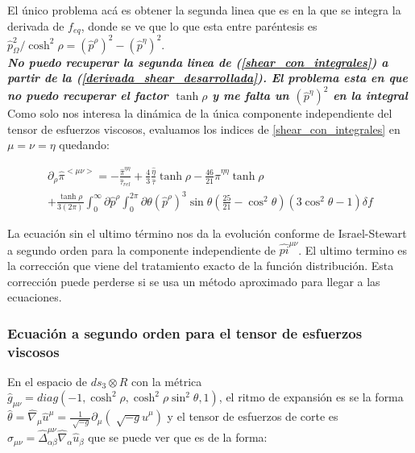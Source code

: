 \documentclass[11pt,a4paper]{article}
\begin{document}
El único problema acá es obtener la segunda linea  que es en la que se integra la derivada de $f_{eq}$, donde se ve que lo que esta entre paréntesis es $\hat{p}_{\Omega}^2/\cosh^2\rho=(\hat{p}^{\rho})^2-(\hat{p}^{\eta})^2$.\\

{\Large{\textbf{\textit{ No puedo recuperar la segunda linea de (\ref{shear_con_integrales}) a partir de la (\ref{derivada_shear_desarrollada}). El problema esta en que no puedo recuperar el factor $\tanh\rho$ y me falta un $(\hat{p}^{\eta})^2$ en la integral}}}}\\

Como solo nos interesa la dinámica de la única componente independiente del tensor de esfuerzos viscosos, evaluamos los indices de \ref{shear_con_integrales} en $\mu=\nu=\eta$ quedando:

\begin{eqnarray}
\partial_{\rho}\hat{\pi}^{<{\mu}{\nu}>}=
-\frac{\hat{\pi}^{{\eta}{\eta}}}{\hat{\tau}_{rel}}
+\frac{4}{3}\frac{\hat{\eta}}{\hat{\tau}}\tanh\rho
-\frac{46}{21}\hat{\pi}^{\eta\eta}\tanh\rho\nonumber\\
+\frac{\tanh\rho}{3(2\pi)}\int_{0}^{\infty}\partial\hat{p}^{\rho}\int_{0}^{2\pi}\partial\theta(\hat{p}^{\rho})^3\sin\theta(\frac{25}{21}-\cos^2\theta)(3\cos^2\theta-1)\delta{f}
\label{shear_exacta}
\end{eqnarray}

La ecuación sin el ultimo término nos da la evolución conforme de Israel-Stewart a segundo orden para la componente independiente de $\hat{pi}^{{\mu}{\nu}}$. El ultimo termino es la corrección que viene del tratamiento exacto de la función distribución. Esta corrección puede perderse si se usa un método aproximado para llegar a las ecuaciones.



\subsubsection{Ecuación a segundo orden para el tensor de esfuerzos viscosos}


En el espacio de $ds_{3}{\otimes}R$ con la métrica $\hat{g}_{{\mu}{\nu}}=diag(-1,\cosh^2\rho,\cosh^2\rho\sin^2\theta,1)$, el ritmo de expansión es se la forma $\hat{\theta}=\hat{\nabla}_{\mu}\hat{u}^{\mu}=\frac{1}{\sqrt[]{-g}}\partial_{\mu}(\sqrt[]{-g}\hat{u}^{\mu})$ y el tensor de esfuerzos de corte es $\sigma_{{\mu}{\nu}}=\hat{\Delta}^{{\mu}{\nu}}_{{\alpha}{\beta}}\hat{\nabla}_{\alpha}\hat{u}_{\beta}$ que se puede ver que es de la forma:
\end{document}
